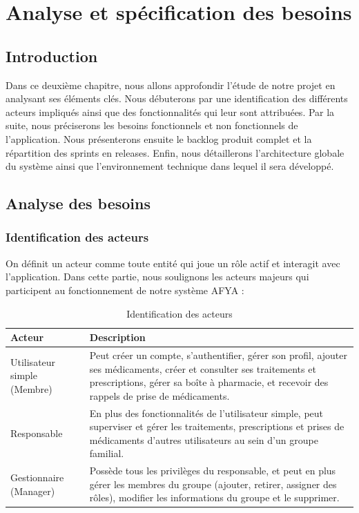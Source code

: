 \chapter{Analyse et spécification des besoins}

\section{Introduction}
Dans ce deuxième chapitre, nous allons approfondir l'étude de notre projet en analysant ses éléments clés. Nous débuterons par une identification des différents acteurs impliqués ainsi que des fonctionnalités qui leur sont attribuées. Par la suite, nous préciserons les besoins fonctionnels et non fonctionnels de l'application. Nous présenterons ensuite le backlog produit complet et la répartition des sprints en releases. Enfin, nous détaillerons l'architecture globale du système ainsi que l'environnement technique dans lequel il sera développé.

\section{Analyse des besoins}

\subsection{Identification des acteurs}
On définit un acteur comme toute entité qui joue un rôle actif et interagit avec l'application. Dans cette partie, nous soulignons les acteurs majeurs qui participent au fonctionnement de notre système AFYA :

\begin{table}[H]
    \centering
    \renewcommand{\arraystretch}{1.3}
    \begin{tabular}{|p{3.5cm}|p{10.5cm}|}
        \hline
        \textbf{Acteur} & \textbf{Description} \\
        \hline
        Utilisateur simple (Membre) & Peut créer un compte, s'authentifier, gérer son profil, ajouter ses médicaments, créer et consulter ses traitements et prescriptions, gérer sa boîte à pharmacie, et recevoir des rappels de prise de médicaments. \\
        \hline
        Responsable & En plus des fonctionnalités de l'utilisateur simple, peut superviser et gérer les traitements, prescriptions et prises de médicaments d'autres utilisateurs au sein d'un groupe familial. \\
        \hline
        Gestionnaire (Manager) & Possède tous les privilèges du responsable, et peut en plus gérer les membres du groupe (ajouter, retirer, assigner des rôles), modifier les informations du groupe et le supprimer. \\
        \hline
    \end{tabular}
    \captionsetup{justification=centering}
    \caption{Identification des acteurs}
    \label{tab:actors}
\end{table}

